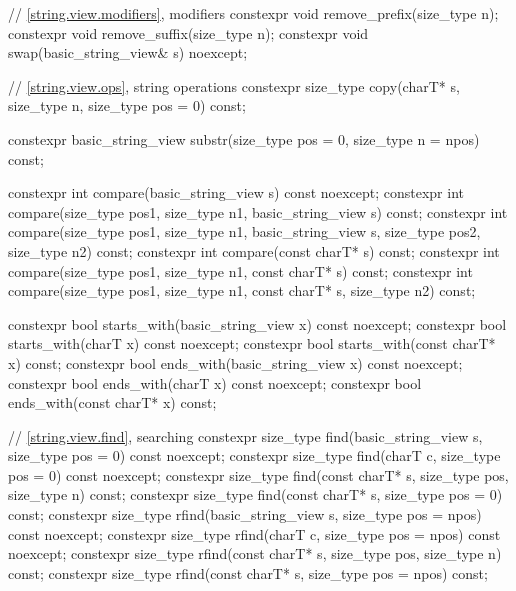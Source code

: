 \begin{codeblock}
{{    // \ref{string.view.modifiers}, modifiers
    constexpr void remove_prefix(size_type n);
    constexpr void remove_suffix(size_type n);
    constexpr void swap(basic_string_view& s) noexcept;

    // \ref{string.view.ops}, string operations
    constexpr size_type copy(charT* s, size_type n, size_type pos = 0) const;

    constexpr basic_string_view substr(size_type pos = 0, size_type n = npos) const;

    constexpr int compare(basic_string_view s) const noexcept;
    constexpr int compare(size_type pos1, size_type n1, basic_string_view s) const;
    constexpr int compare(size_type pos1, size_type n1, basic_string_view s,
                          size_type pos2, size_type n2) const;
    constexpr int compare(const charT* s) const;
    constexpr int compare(size_type pos1, size_type n1, const charT* s) const;
    constexpr int compare(size_type pos1, size_type n1, const charT* s, size_type n2) const;

    constexpr bool starts_with(basic_string_view x) const noexcept;
    constexpr bool starts_with(charT x) const noexcept;
    constexpr bool starts_with(const charT* x) const;
    constexpr bool ends_with(basic_string_view x) const noexcept;
    constexpr bool ends_with(charT x) const noexcept;
    constexpr bool ends_with(const charT* x) const;

    // \ref{string.view.find}, searching
    constexpr size_type find(basic_string_view s, size_type pos = 0) const noexcept;
    constexpr size_type find(charT c, size_type pos = 0) const noexcept;
    constexpr size_type find(const charT* s, size_type pos, size_type n) const;
    constexpr size_type find(const charT* s, size_type pos = 0) const;
    constexpr size_type rfind(basic_string_view s, size_type pos = npos) const noexcept;
    constexpr size_type rfind(charT c, size_type pos = npos) const noexcept;
    constexpr size_type rfind(const charT* s, size_type pos, size_type n) const;
    constexpr size_type rfind(const charT* s, size_type pos = npos) const;

}}
\end{codeblock}
